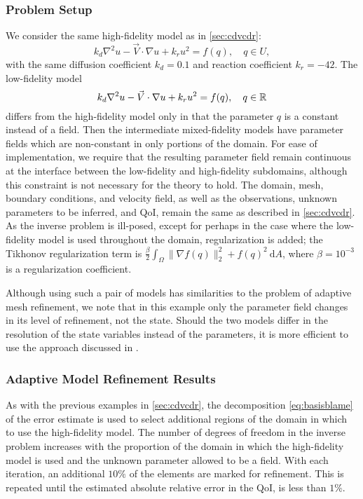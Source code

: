 \subsubsection{Problem Setup}
We consider the same high-fidelity model as in \cref{sec:cdvcdr}:
\begin{equation}
k_d\nabla^2 u - \vec{V}\cdot\nabla u + k_ru^2= f(q),\quad q\in U,
\end{equation}
with the same diffusion coefficient $k_d = 0.1$  and reaction coefficient $k_r = -42$. The low-fidelity model
\begin{equation}
k_d\nabla^2 u - \vec{V}\cdot\nabla u + k_ru^2= f(q),\quad q\in{\mathbb{R}}
\end{equation}
differs from the high-fidelity model only in that the parameter $q$ is a constant instead of a field. Then the intermediate mixed-fidelity models have parameter fields which are non-constant in only portions of the domain. For ease of implementation, we require that the resulting parameter field remain continuous at the interface between the low-fidelity and high-fidelity subdomains, although this constraint is not necessary for the theory to hold. The domain, mesh, boundary conditions, and velocity field, as well as the observations, unknown parameters to be inferred, and QoI, remain the same as described in \cref{sec:cdvcdr}. As the inverse problem is ill-posed, except for perhaps in the case where the low-fidelity model is used throughout the domain, regularization is added; the Tikhonov regularization term is $\frac{\beta}{2}\int_\Omega \|\nabla f(q)\|_2^2+f(q)^2\:\textrm{d}A$, where $\beta=10^{-3}$ is a regularization coefficient.

Although using such a pair of models has similarities to the problem of adaptive mesh refinement, we note that in this example only the parameter field changes in its level of refinement, not the state. Should the two models differ in the resolution of the state variables instead of the parameters, it is more efficient to use the approach discussed in \cite{BecVex05}.
\subsubsection{Adaptive Model Refinement Results}
As with the previous examples in \cref{sec:cdvcdr}, the decomposition \cref{eq:basisblame} of the error estimate is used to select additional regions of the domain in which to use the high-fidelity model. The number of degrees of freedom in the inverse problem increases with the proportion of the domain in which the high-fidelity model is used and the unknown parameter allowed to be a field. With each iteration, an additional $10\%$ of the elements are marked for refinement. This is repeated until the estimated absolute relative error in the QoI, is less than $1\%$.

